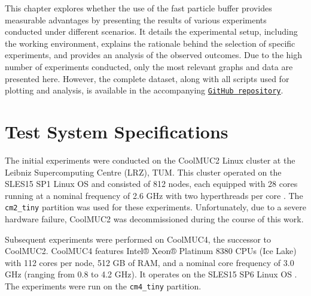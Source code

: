

This chapter explores whether the use of the fast particle buffer provides measurable advantages by presenting the results of various experiments conducted under different scenarios. It details the experimental setup, including the working environment, explains the rationale behind the selection of specific experiments, and provides an analysis of the observed outcomes. Due to the high number of experiments conducted, only the most relevant graphs and data are presented here. However, the complete dataset, along with all scripts used for plotting and analysis, is available in the accompanying \href{https://github.com/xhulia028/GraphView}{\texttt{GitHub repository}}.

\section{Test System Specifications}

The initial experiments were conducted on the CoolMUC2 Linux cluster at the Leibniz Supercomputing Centre (LRZ), TUM. This cluster operated on the SLES15 SP1 Linux OS and consisted of 812 nodes, each equipped with 28 cores running at a nominal frequency of 2.6 GHz with two hyperthreads per core \parencite{coolmuc2}. The \texttt{cm2\_tiny} partition was used for these experiments. Unfortunately, due to a severe hardware failure, CoolMUC2 was decommissioned during the course of this work.

Subsequent experiments were performed on CoolMUC4, the successor to CoolMUC2. CoolMUC4 features Intel® Xeon® Platinum 8380 CPUs (Ice Lake) with 112 cores per node, 512 GB of RAM, and a nominal core frequency of 3.0 GHz (ranging from 0.8 to 4.2 GHz). It operates on the SLES15 SP6 Linux OS \parencite{coolmuc4}. The experiments were run on the \texttt{cm4\_tiny} partition.

